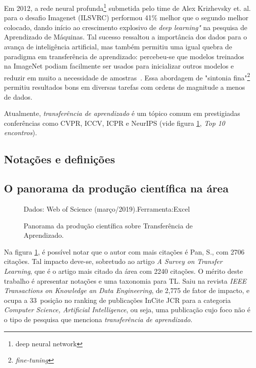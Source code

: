 \documentclass[sigconf]{acmart}
\newcommand{\source}[2]{\raggedleft{}\vspace*{-7mm}\caption*{ \textmd{\scriptsize{Dados: {#1}.\hfill Ferramenta:{#2}}}}}
\begin{document}
  Em 2012, a rede neural profunda\footnote{deep neural network} submetida pelo time de Alex Krizhevsky et. al. para o desafio Imagenet (ILSVRC) performou 41\% melhor que o segundo melhor colocado, dando início ao crescimento explosivo de \emph{deep learning"} na pesquisa de Aprendizado de Máquinas. Tal sucesso ressaltou a importância dos dados para o avança de inteligência artificial, mas também permitiu uma igual quebra de paradigma em transferência de aprendizado: percebeu-se que modelos treinados na ImageNet podiam facilmente ser usados para inicializar outros modelos e reduzir em muito a necessidade de amostras~\cite{Ruder2019Neural}.   Essa abordagem de "sintonia fina"\footnote{\emph{fine-tuning}} permitiu resultados bons em diversas tarefas com ordens de magnitude a menos de dados. 

  Atualmente, \emph{transferência de aprendizado} é um tópico comum em prestigiadas conferências como CVPR, ICCV, ICPR e NeurIPS (vide figura \ref{fig:toptop}, \emph{Top 10 encontros}).
  \subsection{Notações e definições}
  \subsection{O panorama da produção científica na área}\label{sec:panorama}
  \begin{figure}[t]
    \centering
    \source{Web of Science (março/2019)}{Excel}
    \caption{Panorama da produção científica sobre Transferência de Aprendizado.} \label{fig:toptop}
  \end{figure}
  Na figura \ref{fig:toptop}, é possível notar que o autor com mais citações é Pan, S., com 2706 citações. Tal impacto deve-se, sobretudo ao artigo \emph{A Survey on Transfer Learning}, que é o artigo mais citado da área com 2240 citações. O mérito deste trabalho é apresentar notações e uma taxonomia para TL. Saiu na revista \emph{IEEE Transactions on Knowledge an Data Engineering}, de 2,775 de fator de impacto, e ocupa a 33\textordfeminine ~posição no ranking de publicações InCite JCR para a categoria \emph{Computer Science, Artificial Intelligence}, ou seja, uma publicação cujo foco não é o tipo de pesquisa que menciona \emph{transferência de aprendizado}. 
\end{document}
